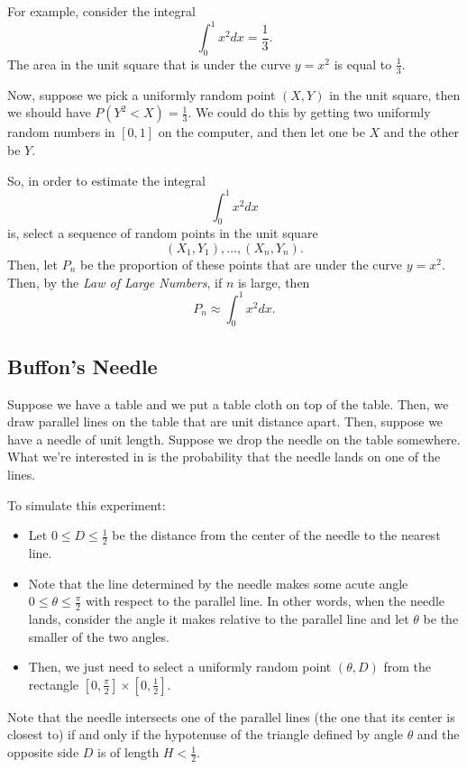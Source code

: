 \documentclass[letterpaper]{article}
\begin{document}
\bigskip 

For example, consider the integral 
\[\int_0^1 x^2 dx = \frac{1}{3}.\]
The area in the unit square that is under the curve $y = x^2$ is equal to $\frac{1}{3}$. 

\bigskip 

Now, suppose we pick a uniformly random point $(X, Y)$ in the unit square, then we should have $P(Y^2 < X) = \frac{1}{3}$. We could do this by getting two uniformly random numbers in $[0, 1]$ on the computer, and then let one be $X$ and the other be $Y$. 

\bigskip 

So, in order to estimate the integral 
\[\int_0^1 x^2 dx\]
is, select a sequence of random points in the unit square
\[(X_1, Y_1), \dots, (X_n, Y_n).\]
Then, let $P_n$ be the proportion of these points that are under the curve $y = x^2$. Then, by the \emph{Law of Large Numbers}, if $n$ is large, then 
\[P_n \approx \int_0^1 x^2 dx.\]


\subsection{Buffon's Needle}
Suppose we have a table and we put a table cloth on top of the table. Then, we draw parallel lines on the table that are unit distance apart. Then, suppose we have a needle of unit length. Suppose we drop the needle on the table somewhere. What we're interested in is the probability that the needle lands on one of the lines. 

\bigskip 

To simulate this experiment: 
\begin{itemize}
    \item Let $0 \leq D \leq \frac{1}{2}$ be the distance from the center of the needle to the nearest line.
    \item Note that the line determined by the needle makes some acute angle $0 \leq \theta \leq \frac{\pi}{2}$ with respect to the parallel line. In other words, when the needle lands, consider the angle it makes relative to the parallel line and let $\theta$ be the smaller of the two angles. 
    \item Then, we just need to select a uniformly random point $(\theta, D)$ from the rectangle $\left[0, \frac{\pi}{2}\right] \times \left[0, \frac{1}{2}\right]$. 
\end{itemize}
Note that the needle intersects one of the parallel lines (the one that its center is closest to) if and only if the hypotenuse of the triangle defined by angle $\theta$ and the opposite side $D$ is of length $H < \frac{1}{2}$. 
\end{document}
